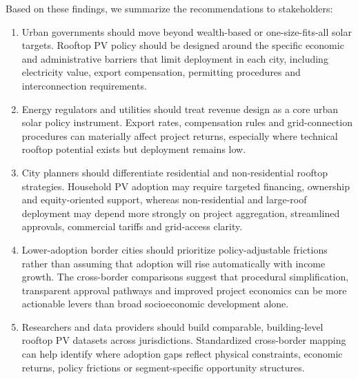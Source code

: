 \documentclass[pdflatex,sn-nature]{sn-jnl}
\begin{document}
Based on these findings, we summarize the recommendations to stakeholders:
\begin{enumerate}
    \item Urban governments should move beyond wealth-based or one-size-fits-all solar targets. Rooftop PV policy should be designed around the specific economic and administrative barriers that limit deployment in each city, including electricity value, export compensation, permitting procedures and interconnection requirements.

    \item Energy regulators and utilities should treat revenue design as a core urban solar policy instrument. Export rates, compensation rules and grid-connection procedures can materially affect project returns, especially where technical rooftop potential exists but deployment remains low.

    \item City planners should differentiate residential and non-residential rooftop strategies. Household PV adoption may require targeted financing, ownership and equity-oriented support, whereas non-residential and large-roof deployment may depend more strongly on project aggregation, streamlined approvals, commercial tariffs and grid-access clarity.

    \item Lower-adoption border cities should prioritize policy-adjustable frictions rather than assuming that adoption will rise automatically with income growth. The cross-border comparisons suggest that procedural simplification, transparent approval pathways and improved project economics can be more actionable levers than broad socioeconomic development alone.

    \item Researchers and data providers should build comparable, building-level rooftop PV datasets across jurisdictions. Standardized cross-border mapping can help identify where adoption gaps reflect physical constraints, economic returns, policy frictions or segment-specific opportunity structures.
\end{enumerate}
\end{document}
